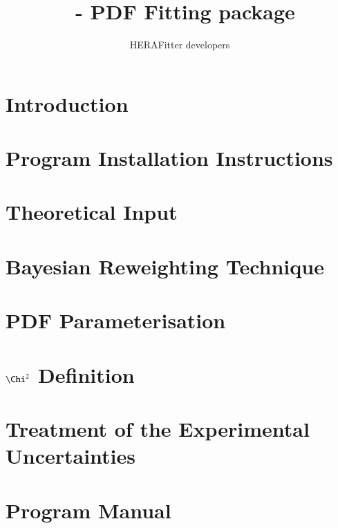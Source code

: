 \documentclass[11pt,a4paper]{article}
\title{\fitter\ - PDF Fitting package}
\author{HERAFitter developers}
\begin{document}
\maketitle
\begin{abstract}
\end{abstract}
\tableofcontents
\newpage
\section{Introduction}
  
\section{Program Installation Instructions} 

 
\section{Theoretical Input}


\section{Bayesian Reweighting Technique}
 
\section{PDF Parameterisation}


\section{$\Chi^2$  Definition}


\section{Treatment of the Experimental Uncertainties}


\section{Program Manual}




\appendix
\end{document}
